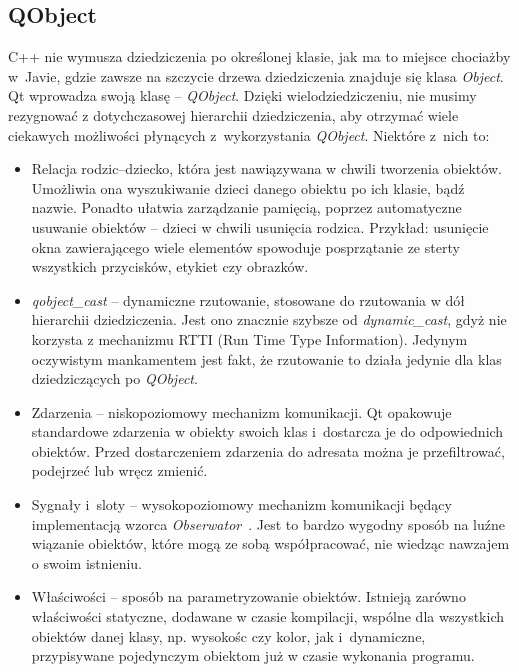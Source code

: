 \subsection{QObject}
C++ nie wymusza dziedziczenia po określonej klasie, jak ma to miejsce chociażby w~Javie, gdzie zawsze na szczycie drzewa dziedziczenia znajduje się klasa \textit{Object}. Qt wprowadza swoją klasę -- \textit{QObject}. Dzięki wielodziedziczeniu, nie musimy rezygnować z dotychczasowej hierarchii dziedziczenia, aby otrzymać wiele ciekawych możliwości płynących z~wykorzystania \textit{QObject}.
Niektóre z~nich to:
\begin{itemize}
\item Relacja rodzic--dziecko, która jest nawiązywana w chwili tworzenia obiektów. Umożliwia ona wyszukiwanie dzieci danego obiektu po ich klasie, bądź nazwie. Ponadto ułatwia zarządzanie pamięcią, poprzez automatyczne usuwanie obiektów -- dzieci w chwili usunięcia rodzica. Przykład: usunięcie okna zawierającego wiele elementów spowoduje posprzątanie ze sterty wszystkich przycisków, etykiet czy obrazków.
\item \textit{qobject\_cast} -- dynamiczne rzutowanie, stosowane do rzutowania w dół hierarchii dziedziczenia. Jest ono znacznie szybsze od \textit{dynamic\_cast}, gdyż nie korzysta z mechanizmu RTTI (Run Time Type Information). Jedynym oczywistym mankamentem jest fakt, że rzutowanie to działa jedynie dla klas dziedziczących po \textit{QObject}.
\item Zdarzenia -- niskopoziomowy mechanizm komunikacji. Qt opakowuje standardowe zdarzenia w obiekty swoich klas i~dostarcza je do odpowiednich obiektów. Przed dostarczeniem zdarzenia do adresata można je przefiltrować, podejrzeć lub wręcz zmienić.
\item Sygnały i~sloty -- wysokopoziomowy mechanizm komunikacji będący implementacją wzorca \textit{Obserwator}~\cite{Patterns}.
Jest to bardzo wygodny sposób na luźne wiązanie obiektów, które mogą ze sobą współpracować, nie wiedząc nawzajem o swoim istnieniu.
\item Właściwości -- sposób na parametryzowanie obiektów. Istnieją zarówno właściwości statyczne, dodawane w czasie kompilacji, wspólne dla wszystkich obiektów danej klasy, np. wysokośc czy kolor, jak i~dynamiczne, przypisywane pojedynczym obiektom już w czasie wykonania programu.
\end{itemize}

